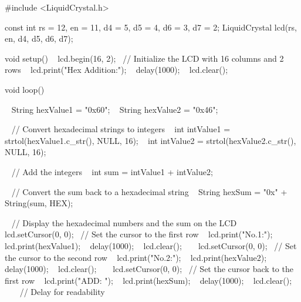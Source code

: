 #include <LiquidCrystal.h>

const int rs = 12, en = 11, d4 = 5, d5 = 4, d6 = 3, d7 = 2;
LiquidCrystal lcd(rs, en, d4, d5, d6, d7);

void setup() {
  lcd.begin(16, 2);  // Initialize the LCD with 16 columns and 2 rows
  lcd.print("Hex Addition:");
  delay(1000);
  lcd.clear();
}

void loop() {
  String hexValue1 = "0x60";
  String hexValue2 = "0x46";

  // Convert hexadecimal strings to integers
  int intValue1 = strtol(hexValue1.c_str(), NULL, 16);
  int intValue2 = strtol(hexValue2.c_str(), NULL, 16);

  // Add the integers
  int sum = intValue1 + intValue2;

  // Convert the sum back to a hexadecimal string
  String hexSum = "0x" + String(sum, HEX);

  // Display the hexadecimal numbers and the sum on the LCD
  lcd.setCursor(0, 0);  // Set the cursor to the first row
  lcd.print("No.1:");
  lcd.print(hexValue1);
  delay(1000);
  lcd.clear();
  
  lcd.setCursor(0, 0);  // Set the cursor to the second row
  lcd.print("No.2:");
  lcd.print(hexValue2);
  delay(1000);
  lcd.clear();
  
  lcd.setCursor(0, 0);  // Set the cursor back to the first row
  lcd.print("ADD: ");
  lcd.print(hexSum);
  delay(1000);
  lcd.clear();
    // Delay for readability
}
